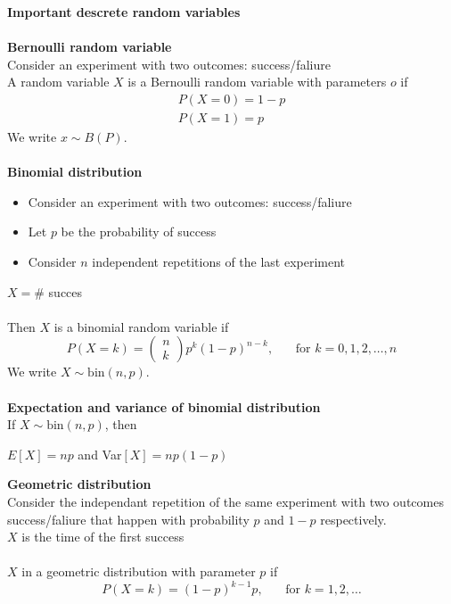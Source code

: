 \documentclass[12pt,a4paper,draft]{report}
\author{Frederik Appel Vardinghus-Nielsen}
\begin{document}
\noindent \textbf{Important descrete random variables}\\\\
\textbf{Bernoulli random variable}\\
Consider an experiment with two outcomes: success/faliure\\
A random variable $X$ is a Bernoulli random variable with parameters $o$ if
\begin{align}
P(X=0)=1-p\\
P(X=1)=p
\end{align}
We write $x\sim B(P)$.
\\\\
\textbf{Binomial distribution}
\begin{itemize}
\itemsep\setlength{-0.5em}
\item Consider an experiment with two outcomes: success/faliure
\item Let $p$ be the probability of success
\item Consider $n$ independent repetitions of the last experiment
\end{itemize}
$X=\#$ succes\\\\
Then $X$ is a binomial random variable if
\begin{equation}
P(X=k)=\begin{pmatrix}
n \\ 
k
\end{pmatrix}
p^k(1-p)^{n-k}, \phantom{mm}\text{for }k=0,1,2,\ldots,n
\end{equation}
We write $X\sim \text{bin}(n,p)$.\\\\
\textbf{Expectation and variance of binomial distribution}\\
If $X\sim \text{bin}(n,p)$, then
\begin{center}
$E[X]=np$ and Var$[X]=np(1-p)$
\end{center}
\textbf{Geometric distribution}\\
Consider the independant repetition of the same experiment with two outcomes success/faliure that happen with probability $p$ and $1-p$ respectively.\\
$X$ is the time of the first success\\\\
$X$ in a geometric distribution with parameter $p$ if
\begin{equation}
P(X=k)=(1-p)^{k-1}p,\phantom{mm}\text{for }k=1,2,\ldots
\end{equation}
\end{document}
